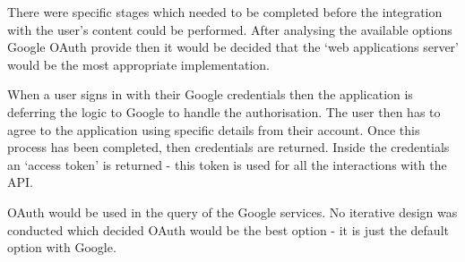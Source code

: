 There were specific stages which needed to be completed before the integration with the user's content could be performed. After analysing the available options Google OAuth provide then it would be decided that the `web applications server' would be the most appropriate implementation.

When a user signs in with their Google credentials then the application is deferring the logic to Google to handle the authorisation. The user then has to agree to the application using specific details from their account. Once this process has been completed, then credentials are returned. Inside the credentials an `access token' is returned - this token is used for all the interactions with the API.

OAuth would be used in the query of the Google services. No iterative design was conducted which decided OAuth would be the best option - it is just the default option with Google.
